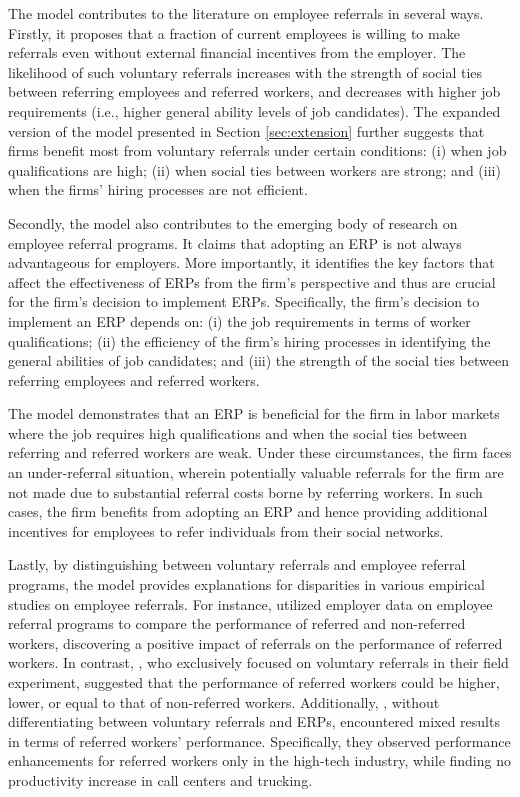 \documentclass[12pt]{article}
\begin{document}
The model contributes to the literature on employee referrals in several ways. Firstly, it proposes that a fraction of current employees is willing to make referrals even without external financial incentives from the employer. The likelihood of such voluntary referrals increases with the strength of social ties between referring employees and referred workers, and decreases with higher job requirements (i.e., higher general ability levels of job candidates). The expanded version of the model presented in Section \ref{sec:extension} further suggests that firms benefit most from voluntary referrals under certain conditions: (i) when job qualifications are high; (ii) when social ties between workers are strong; and (iii) when the firms' hiring processes are not efficient.

Secondly, the model also contributes to the emerging body of research on employee referral programs. It claims that adopting an ERP is not always advantageous for employers. More importantly, it identifies the key factors that affect the effectiveness of ERPs from the firm's perspective and thus are crucial for the firm's decision to implement ERPs. Specifically, the firm's decision to implement an ERP depends on: (i) the job requirements in terms of worker qualifications; (ii) the efficiency of the firm's hiring processes in identifying the general abilities of job candidates; and (iii) the strength of the social ties between referring employees and referred workers.

The model demonstrates that an ERP is beneficial for the firm in labor markets where the job requires high qualifications and when the social ties between referring and referred workers are weak. Under these circumstances, the firm faces an under-referral situation, wherein potentially valuable referrals for the firm are not made due to substantial referral costs borne by referring workers. In such cases, the firm benefits from adopting an ERP and hence providing additional incentives for employees to refer individuals from their social networks.

Lastly, by distinguishing between voluntary referrals and employee referral programs, the model provides explanations for disparities in various empirical studies on employee referrals. For instance, \cite{castilla2005social} utilized employer data on employee referral programs to compare the performance of referred and non-referred workers, discovering a positive impact of referrals on the performance of referred workers. In contrast, \cite{pallais2016referential}, who exclusively focused on voluntary referrals in their field experiment, suggested that the performance of referred workers could be higher, lower, or equal to that of non-referred workers. Additionally, \cite{brown2016informal}, without differentiating between voluntary referrals and ERPs, encountered mixed results in terms of referred workers' performance. Specifically, they observed performance enhancements for referred workers only in the high-tech industry, while finding no productivity increase in call centers and trucking. 
\end{document}
